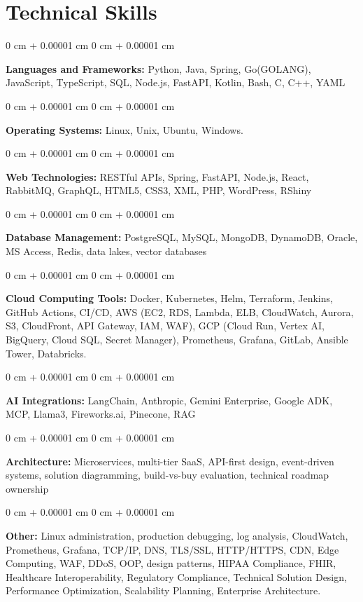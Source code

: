 \documentclass[10pt, letterpaper]{article}
\newenvironment{onecolentry}{
    \begin{adjustwidth}{
        0 cm + 0.00001 cm
    }{
        0 cm + 0.00001 cm
    }
}{
    \end{adjustwidth}
} %
\begin{document}
    \section{Technical Skills}
    \vspace{2 pt }
    \begin{onecolentry}
    \textbf{Languages and Frameworks:} Python, Java, Spring, Go(GOLANG), JavaScript, TypeScript, SQL, Node.js, FastAPI, Kotlin, Bash, C, C++, YAML
    \end{onecolentry}
    \begin{onecolentry}
        \textbf{Operating Systems:} Linux, Unix, Ubuntu, Windows.
    \end{onecolentry}
    \begin{onecolentry}
         \textbf{Web Technologies:} RESTful APIs, Spring, FastAPI, Node.js, React, RabbitMQ, GraphQL, HTML5, CSS3, XML, PHP, WordPress, RShiny
    \end{onecolentry}
    \begin{onecolentry}
        \textbf{Database Management:} PostgreSQL, MySQL, MongoDB, DynamoDB, Oracle, MS Access, Redis, data lakes, vector databases
    \end{onecolentry}
    \begin{onecolentry}
        \textbf{Cloud Computing Tools:}
Docker, Kubernetes, Helm, Terraform, Jenkins, GitHub Actions, CI/CD, AWS (EC2, RDS, Lambda, ELB, CloudWatch, Aurora, S3, CloudFront, API Gateway, IAM, WAF), GCP (Cloud Run, Vertex AI, BigQuery, Cloud SQL, Secret Manager), Prometheus, Grafana, GitLab, Ansible Tower, Databricks.
    \end{onecolentry}
    \begin{onecolentry}
         \textbf{AI Integrations:} LangChain, Anthropic, Gemini Enterprise, Google ADK, MCP, Llama3, Fireworks.ai, Pinecone, RAG
    \end{onecolentry}
    \begin{onecolentry}
        \textbf{Architecture:} Microservices, multi-tier SaaS, API-first design, event-driven systems, solution diagramming, build-vs-buy evaluation, technical roadmap ownership
    \end{onecolentry}
        \begin{onecolentry}
     \textbf{Other:} Linux administration, production debugging, log analysis, CloudWatch, Prometheus, Grafana, TCP/IP, DNS, TLS/SSL, HTTP/HTTPS, CDN, Edge Computing, WAF, DDoS, OOP, design patterns, HIPAA Compliance, FHIR, Healthcare Interoperability, Regulatory Compliance, Technical Solution Design, Performance Optimization, Scalability Planning, Enterprise Architecture.
    \end{onecolentry}
\end{document}
